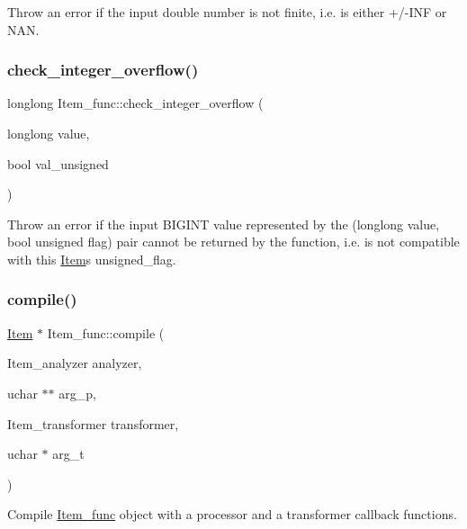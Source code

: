 Throw an error if the input double number is not finite, i.\+e. is either +/-\/I\+NF or N\+AN. \mbox{\label{classItem__func_a47683db1fe024c786d27ca475c916c00}} 
\subsubsection{\texorpdfstring{check\+\_\+integer\+\_\+overflow()}{check\_integer\_overflow()}}
{\footnotesize\ttfamily longlong Item\+\_\+func\+::check\+\_\+integer\+\_\+overflow (\begin{DoxyParamCaption}\item[{longlong}]{value,  }\item[{bool}]{val\+\_\+unsigned }\end{DoxyParamCaption})\hspace{0.3cm}{\ttfamily [inline]}}

Throw an error if the input B\+I\+G\+I\+NT value represented by the (longlong value, bool unsigned flag) pair cannot be returned by the function, i.\+e. is not compatible with this \mbox{\hyperlink{classItem}{Item}}\textquotesingle{}s unsigned\+\_\+flag. \mbox{\label{classItem__func_a11d488fd62efb4c1ad9f85009057cd1c}} 
\subsubsection{\texorpdfstring{compile()}{compile()}}
{\footnotesize\ttfamily \mbox{\hyperlink{classItem}{Item}} $\ast$ Item\+\_\+func\+::compile (\begin{DoxyParamCaption}\item[{Item\+\_\+analyzer}]{analyzer,  }\item[{uchar $\ast$$\ast$}]{arg\+\_\+p,  }\item[{Item\+\_\+transformer}]{transformer,  }\item[{uchar $\ast$}]{arg\+\_\+t }\end{DoxyParamCaption})\hspace{0.3cm}{\ttfamily [virtual]}}

Compile \mbox{\hyperlink{classItem__func}{Item\+\_\+func}} object with a processor and a transformer callback functions.

